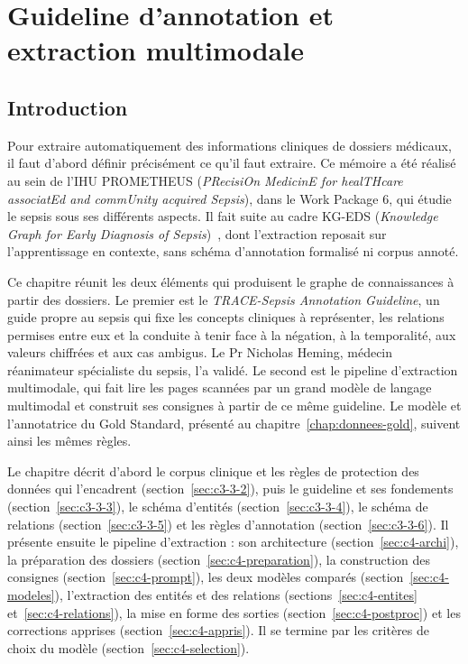\chapter{Guideline d'annotation et extraction multimodale}
\label{chap:extraction}

\section{Introduction}\label{sec:c3-3-1}

Pour extraire automatiquement des informations cliniques de dossiers médicaux, il faut d'abord définir précisément ce qu'il faut extraire. Ce mémoire a été réalisé au sein de l'IHU PROMETHEUS (\emph{PRecisiOn MedicinE for healTHcare associatEd and commUnity acquired Sepsis}), dans le Work Package 6, qui étudie le sepsis sous ses différents aspects. Il fait suite au cadre KG-EDS (\emph{Knowledge Graph for Early Diagnosis of Sepsis})~\cite{kgeds}, dont l'extraction reposait sur l'apprentissage en contexte, sans schéma d'annotation formalisé ni corpus annoté.

Ce chapitre réunit les deux éléments qui produisent le graphe de connaissances à partir des dossiers. Le premier est le \emph{TRACE-Sepsis Annotation Guideline}, un guide propre au sepsis qui fixe les concepts cliniques à représenter, les relations permises entre eux et la conduite à tenir face à la négation, à la temporalité, aux valeurs chiffrées et aux cas ambigus. Le Pr Nicholas Heming, médecin réanimateur spécialiste du sepsis, l'a validé. Le second est le pipeline d'extraction multimodale, qui fait lire les pages scannées par un grand modèle de langage multimodal et construit ses consignes à partir de ce même guideline. Le modèle et l'annotatrice du Gold Standard, présenté au chapitre~\ref{chap:donnees-gold}, suivent ainsi les mêmes règles.

Le chapitre décrit d'abord le corpus clinique et les règles de protection des données qui l'encadrent (section~\ref{sec:c3-3-2}), puis le guideline et ses fondements (section~\ref{sec:c3-3-3}), le schéma d'entités (section~\ref{sec:c3-3-4}), le schéma de relations (section~\ref{sec:c3-3-5}) et les règles d'annotation (section~\ref{sec:c3-3-6}). Il présente ensuite le pipeline d'extraction : son architecture (section~\ref{sec:c4-archi}), la préparation des dossiers (section~\ref{sec:c4-preparation}), la construction des consignes (section~\ref{sec:c4-prompt}), les deux modèles comparés (section~\ref{sec:c4-modeles}), l'extraction des entités et des relations (sections~\ref{sec:c4-entites} et~\ref{sec:c4-relations}), la mise en forme des sorties (section~\ref{sec:c4-postproc}) et les corrections apprises (section~\ref{sec:c4-appris}). Il se termine par les critères de choix du modèle (section~\ref{sec:c4-selection}).

